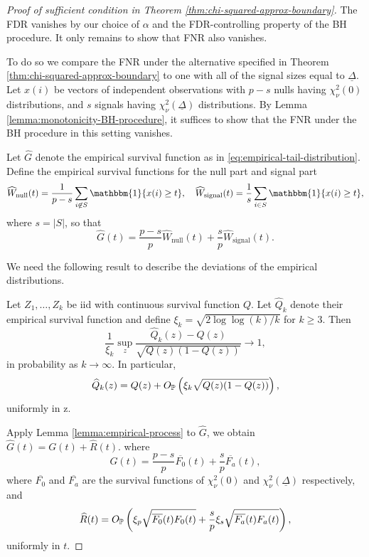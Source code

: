 \begin{proof}[Proof of sufficient condition in Theorem \ref{thm:chi-squared-approx-boundary}]
The FDR vanishes by our choice of $\alpha$ and the FDR-controlling property of the BH procedure.
It only remains to show that FNR also vanishes.

To do so we compare the FNR under the alternative specified in Theorem \ref{thm:chi-squared-approx-boundary} to one with all of the signal sizes equal to $\underline{\Delta}$.
Let $x(i)$ be vectors of independent observations with $p-s$ nulls having $\chi^2_\nu(0)$ distributions, and $s$ signals having $\chi^2_\nu(\underline{\Delta})$ distributions.
By Lemma \ref{lemma:monotonicity-BH-procedure}, it suffices to show that the FNR under the BH procedure in this setting vanishes.

Let $\widehat{G}$ denote the empirical survival function as in \eqref{eq:empirical-tail-distribution}.
Define the empirical survival functions for the null part and signal part
\begin{equation} \label{eq:empirical-survival-null-signal}
    \widehat{W}_\text{null}(t) = \frac{1}{p-s}\sum_{i\not\in S}\mathbbm{1}\{x(i) \ge t\},
    \quad
    \widehat{W}_\text{signal}(t) = \frac{1}{s}\sum_{i\in S}\mathbbm{1}\{x(i) \ge t\},
\end{equation}
where $s=|S|$, so that
$$
\widehat{G}(t) = \frac{p-s}{p}\widehat{W}_\text{null}(t) + \frac{s}{p}\widehat{W}_\text{signal}(t).
$$

We need the following result to describe the deviations of the empirical distributions.
\begin{lemma} \label{lemma:empirical-process}
Let $Z_1,\ldots,Z_k$ be iid with continuous survival function $Q$.
Let $\widehat{Q}_k$ denote their empirical survival function and define 
$\xi_k = \sqrt{2\log{\log{(k)}}/k}$ for $k \ge 3$. 
Then
$$
\frac{1}{\xi_k}\sup_z\frac{\widehat{Q}_k(z) - Q(z)}{\sqrt{Q(z)(1 - Q(z))}} \to 1,
$$
in probability as $k \to \infty$.
In particular,
$$
\widehat{Q}_k(z) = Q(z) + O_\P\left(\xi_k\sqrt{Q(z)(1 - Q(z))}\right),
$$
uniformly in z.
\end{lemma}

Apply Lemma \ref{lemma:empirical-process} to $\widehat{G}$, we obtain
$\widehat{G}(t) = G(t) + \widehat{R}(t)$.
where 
\begin{equation} \label{eq:empirical-process-mean}
    G(t) = \frac{p-s}{p}\overline{F_0}(t) + \frac{s}{p}\overline{F_a}(t),
\end{equation}
where $\overline{F_0}$ and $\overline{F_{a}}$ are the survival functions of $\chi_\nu^2(0)$ and $\chi_\nu^2(\underline{\Delta})$ respectively, and 
\begin{equation} \label{eq:empirical-process-residual}
    \widehat{R}(t) = O_\P\left(\xi_p\sqrt{\overline{F_0}(t)F_0(t)} + \frac{s}{p}\xi_s\sqrt{\overline{F_a}(t)F_a(t)}\right),
\end{equation}
uniformly in $t$.


\end{proof}
